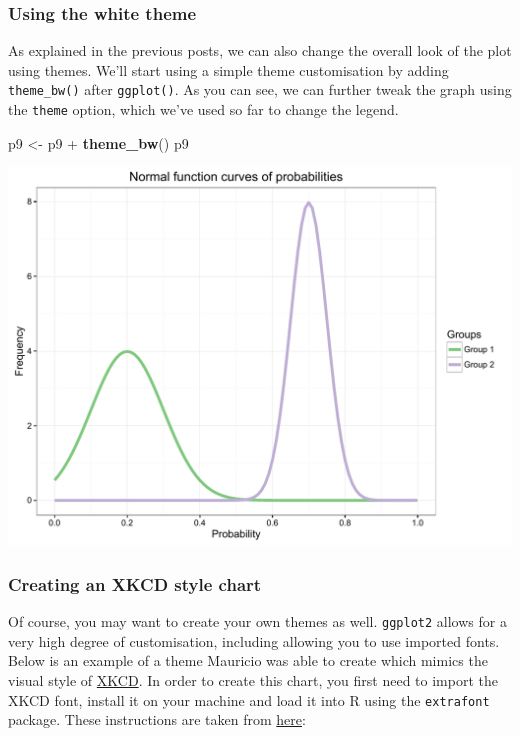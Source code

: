 \documentclass[]{article}
\newenvironment{Shaded}{\begin{snugshade}}{\end{snugshade}}
\newcommand{\KeywordTok}[1]{\textcolor[rgb]{0.13,0.29,0.53}{\textbf{{#1}}}}
\newcommand{\StringTok}[1]{\textcolor[rgb]{0.31,0.60,0.02}{{#1}}}
\newcommand{\NormalTok}[1]{{#1}}
\begin{document}
\subsubsection{Using the white theme}\label{using-the-white-theme-8}

As explained in the previous posts, we can also change the overall look
of the plot using themes. We'll start using a simple theme customisation
by adding \texttt{theme\_bw()} after \texttt{ggplot()}. As you can see,
we can further tweak the graph using the \texttt{theme} option, which
we've used so far to change the legend.

\begin{Shaded}
\begin{Highlighting}[]
\NormalTok{p9 <-}\StringTok{ }\NormalTok{p9 +}\StringTok{ }\KeywordTok{theme_bw}\NormalTok{()}
\NormalTok{p9}
\end{Highlighting}
\end{Shaded}

\begin{center}\includegraphics{0_all_posts_pdf/function_13-1} \end{center}

\subsubsection{Creating an XKCD style
chart}\label{creating-an-xkcd-style-chart-8}

Of course, you may want to create your own themes as well.
\texttt{ggplot2} allows for a very high degree of customisation,
including allowing you to use imported fonts. Below is an example of a
theme Mauricio was able to create which mimics the visual style of
\href{http://xkcd.com/}{XKCD}. In order to create this chart, you first
need to import the XKCD font, install it on your machine and load it
into R using the \texttt{extrafont} package. These instructions are
taken from
\href{https://www.google.com.au/url?sa=t\&rct=j\&q=\&esrc=s\&source=web\&cd=1\&ved=0ahUKEwiWzafchdPJAhVBpJQKHe_LDT8QFggbMAA\&url=https\%3A\%2F\%2Fcran.r-project.org\%2Fweb\%2Fpackages\%2Fxkcd\%2Fvignettes\%2Fxkcd-intro.pdf\&usg=AFQjCNE-KciGY14e-Q1buYIVmTFC0ht__Q\&sig2=DZUwkvIHwfNWtTtkcz94jg}{here}:
\end{document}

